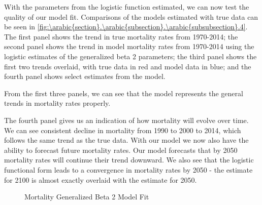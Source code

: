 \documentclass[10pt]{article}
\renewcommand{\thesection}{\arabic{section}}
\renewcommand{\thesubsection}{\thesection.\arabic{subsection}}
\renewcommand{\thesubsubsection}{\thesubsection.\arabic{subsubsection}}
\renewcommand{\subsubsection}[2][]{\oldsubsubsection[#1]{#2}\index{#1}\label{sec:\thesubsubsection}}
\numberwithin{equation}{subsection}
\newcommand*{\FigureDir}{../../graphs}
\begin{document}
\par With the parameters from the logistic function estimated, we can now test the quality of our model fit. Comparisons of the models estimated with true data can be seen in \autoref{fig:\thesubsubsection.4}. The first panel shows the trend in true mortality rates from 1970-2014; the second panel shows the trend in model mortality rates from 1970-2014 using the logistic estimates of the generalized beta 2 parameters; the third panel shows the first two trends overlaid, with true data in red and model data in blue; and the fourth panel shows select estimates from the model.

\par From the first three panels, we can see that the model represents the general trends in mortality rates properly. 

\par The fourth panel gives us an indication of how mortality will evolve over time. We can see consistent decline in mortality from 1990 to 2000 to 2014, which follows the same trend as the true data. With our model we now also have the ability to forecast future mortality rates. Our model forecasts that by 2050 mortality rates will continue their trend downward. We also see that the logistic functional form leads to a convergence in mortality rates by 2050 - the estimate for 2100 is almost exactly overlaid with the estimate for 2050.

\begin{figure}[!ht]
   \centering
   \caption{\label{fig:\thesubsubsection.4}Mortality Generalized Beta 2 Model Fit}
\end{figure}

\end{document}

